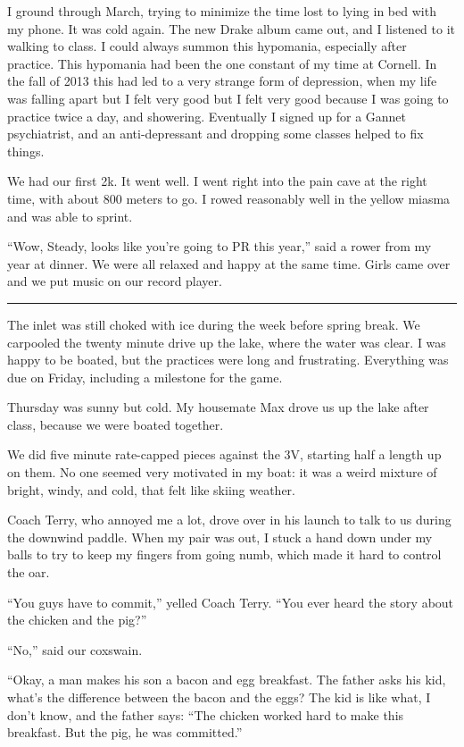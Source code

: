 I ground through March, trying to minimize the time lost to lying in bed with my
phone.  It was cold again.  The new Drake album came out, and I listened to it
walking to class.  I could always summon this hypomania, especially after
practice.  This hypomania had been the one constant of my time at Cornell.  In
the fall of 2013 this had led to a very strange form of depression, when my
life was falling apart but I felt very good but I felt very good because I was
going to practice twice a day, and showering.  Eventually I signed up for a
Gannet psychiatrist, and an anti-depressant and dropping some classes helped to
fix things.

We had our first 2k.  It went well.  I went right into the pain cave at the
right time, with about 800 meters to go.  I rowed reasonably well in the yellow
miasma and was able to sprint.  

``Wow, Steady, looks like you're going to PR this year,'' said a rower from my
year at dinner.  We were all relaxed and happy at the same time.  Girls came
over and we put music on our record player. 

\plainfancybreak{12pt}{2}{* * *}

The inlet was still choked with ice during the week before spring break.  We
carpooled the twenty minute drive up the lake, where the water was clear.  I was
happy to be boated, but the practices were long and frustrating.  Everything was
due on Friday, including a milestone for the game. 

Thursday was sunny but cold.  My housemate Max drove us up the lake after
class, because we were boated together. 

We did five minute rate-capped pieces against the 3V, starting half a length up
on them.  No one seemed very motivated in my boat: it was a weird mixture of
bright, windy, and cold, that felt like skiing weather.

Coach Terry, who annoyed me a lot, drove over in his launch to talk to us during
the downwind paddle.  When my pair was out, I stuck a hand down under my balls
to try to keep my fingers from going numb, which made it hard to control the
oar.

``You guys have to commit,'' yelled Coach Terry.  ``You ever heard the story
about the chicken and the pig?'' 

``No,'' said our coxswain.  

``Okay, a man makes his son a bacon and egg breakfast.  The father asks his kid,
what's the difference between the bacon and the eggs?  The kid is like what, I
don't know, and the father says: ``The chicken worked hard to make this
breakfast.  But the pig, he was committed.''

